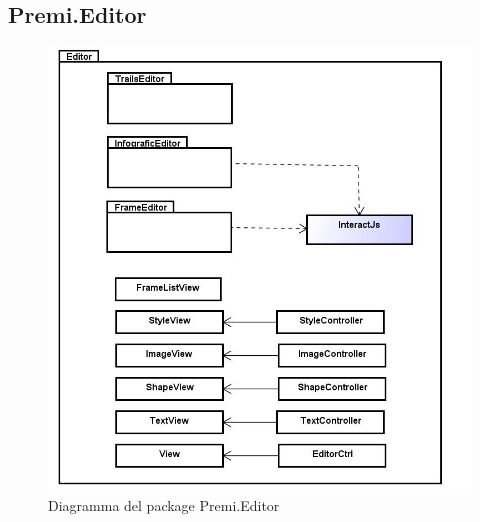 \subsection{Premi.Editor}
\begin{figure}[h!]
\begin{center}
\includegraphics[scale=0.45]{img/diapkg/editor-class.jpg}
\caption{Diagramma del package Premi.Editor}
\end{center}
\end{figure}
\clearpage
